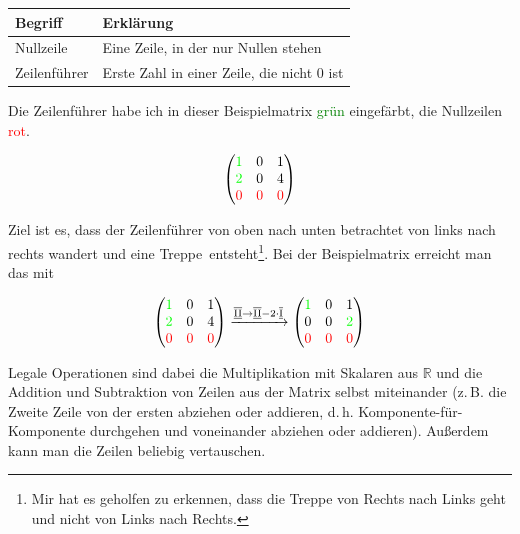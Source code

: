 \documentclass{scrartcl}
\newcommand{\ro}[1]{\ensuremath{\overline{\textrm{\underline{#1}}}}}
\begin{document}
\begin{tabular}{|l|l|}
	\hline
	Begriff & Erklärung\\ \hline
	Nullzeile & Eine Zeile, in der nur Nullen stehen\\
	Zeilenführer & Erste Zahl in einer Zeile, die nicht $0$ ist\\
	\hline
\end{tabular}

Die Zeilenführer habe ich in dieser Beispielmatrix \textcolor{green}{grün} eingefärbt, die 
Nullzeilen \textcolor{red}{rot}.

\begin{equation}
	\begin{pmatrix*}
		\textcolor{green}{1} & 0 & 1\\
		\textcolor{green}{2} & 0 & 4\\
		\textcolor{red}{0} & \textcolor{red}{0} & \textcolor{red}{0}\\
	\end{pmatrix*}
\end{equation}

Ziel ist es, dass der Zeilenführer von oben nach unten betrachtet von links nach rechts wandert und
eine \frq Treppe\flq\ entsteht\footnote{Mir hat es geholfen zu erkennen, dass die Treppe von Rechts nach
Links geht und nicht von Links nach Rechts.}.
Bei der Beispielmatrix erreicht man das mit 

\begin{equation}
	\begin{pmatrix*}
		\textcolor{green}{1} & 0 & 1\\
		\textcolor{green}{2} & 0 & 4\\
		\textcolor{red}{0} & \textcolor{red}{0} & \textcolor{red}{0}\\
	\end{pmatrix*} \xrightarrow{\ro{II} \rightarrow \ro{II} - 2\cdot \ro{I}} \begin{pmatrix*}
		\textcolor{green}{1} & 0 & 1\\
		0 & 0 & \textcolor{green}{2}\\
		\textcolor{red}{0} & \textcolor{red}{0} & \textcolor{red}{0}\\
	\end{pmatrix*}
\end{equation}

Legale Operationen sind dabei die Multiplikation mit Skalaren aus $\mathbb{R}$ und die Addition und Subtraktion von
Zeilen aus der Matrix selbst miteinander (z.\,B. die Zweite Zeile von der ersten abziehen oder addieren, d.\,h. Komponente-für-Komponente
durchgehen und voneinander abziehen oder addieren). Außerdem kann man die Zeilen beliebig vertauschen.
\end{document}
